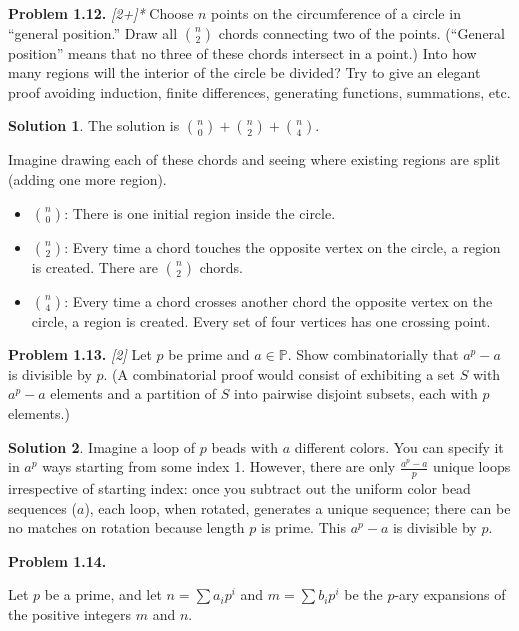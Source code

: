 \documentclass[11pt]{article}
\theoremstyle{definition}
\newtheorem*{solution}{Solution}
\renewcommand{\P}{\mathbb{P}}
\newcounter{probnum}
\newcommand{\problem}[1]{%
  \setcounter{probnum}{#1}%
  \medskip
  \noindent\textbf{Problem 1.#1.}\quad
}
\begin{document}
\problem{12} \textit{[2+]*}
Choose $n$ points on the circumference of a circle in ``general position.''
Draw all $\binom{n}{2}$ chords connecting two of the points.
(``General position'' means that no three of these chords intersect in a point.)
Into how many regions will the interior of the circle be divided?
Try to give an elegant proof avoiding induction, finite differences, generating functions,
summations, etc.

\begin{solution}
The solution is $\binom{n}{0} + \binom{n}{2} + \binom{n}{4}$.

Imagine drawing each of these chords and seeing where existing regions are split
(adding one more region).
\begin{itemize}
  \item $\binom{n}{0}$: There is one initial region inside the circle.
  \item $\binom{n}{2}$: Every time a chord touches the opposite vertex on the
    circle, a region is created. There are $\binom{n}{2}$ chords.
  \item $\binom{n}{4}$: Every time a chord crosses another chord the opposite
    vertex on the circle, a region is created. Every set of four vertices has
    one crossing point.
\end{itemize}
\end{solution}

\problem{13} \textit{[2]}
Let $p$ be prime and $a\in\P$. Show combinatorially that $a^p - a$ is divisible
by $p$. (A combinatorial proof would consist of exhibiting a set $S$ with $a^p - a$
elements and a partition of $S$ into pairwise disjoint subsets, each with $p$
elements.)

\begin{solution}
Imagine a loop of $p$ beads with $a$ different colors. You can specify it in $a^p$
ways starting from some index 1. However, there are only $\frac{a^p - a}{p}$ unique
loops irrespective of starting index: once you subtract out the uniform color bead
sequences ($a$), each loop, when rotated, generates a unique sequence; there can be
no matches on rotation because length $p$ is prime. This $a^p - a$ is divisible
by $p$.
\end{solution}

\problem{14}
Let $p$ be a prime, and let $n = \sum a_i p^i$ and $m = \sum b_i p^i$ be the
$p$-ary expansions of the positive integers $m$ and $n$.
\end{document}
